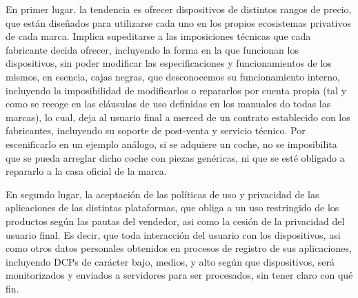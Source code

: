 En primer lugar, la tendencia es ofrecer dispositivos de distintos rangos de precio, que están diseñados para utilizarse cada uno en los propios ecosistemas privativos de cada marca. Implica supeditarse a las imposiciones técnicas que cada fabricante decida ofrecer, incluyendo la forma en la que funcionan los dispositivos, sin poder modificar las especificaciones y funcionamientos de los mismos, en esencia, cajas negras, que desconocemos su funcionamiento interno, incluyendo la imposibilidad de modificarlos o repararlos por cuenta propia (tal y como se recoge en las cláusulas de uso definidas en los manuales do todas las marcas), lo cual, deja al usuario final a merced de un contrato establecido con los fabricantes, incluyendo su soporte de post-venta y servicio técnico. Por escenificarlo en un ejemplo análogo, si se adquiere un coche, no se imposibilita que se pueda arreglar dicho coche con piezas genéricas, ni que se esté obligado a repararlo a la casa oficial de la marca.

En segundo lugar, la aceptación de las políticas de uso y privacidad de las aplicaciones de las distintas plataformas, que obliga a un uso restringido de los productos según las pautas del vendedor, asi como la cesión de la privacidad del usuario final. Es decir, que toda interacción del usuario con los dispositivos, asi como otros datos personales obtenidos en procesos de registro de sus aplicaciones, incluyendo DCPs de carácter bajo, medios, y alto según que dispositivos, será monitorizados y enviados a servidores para ser procesados, sin tener claro con qué fin.

